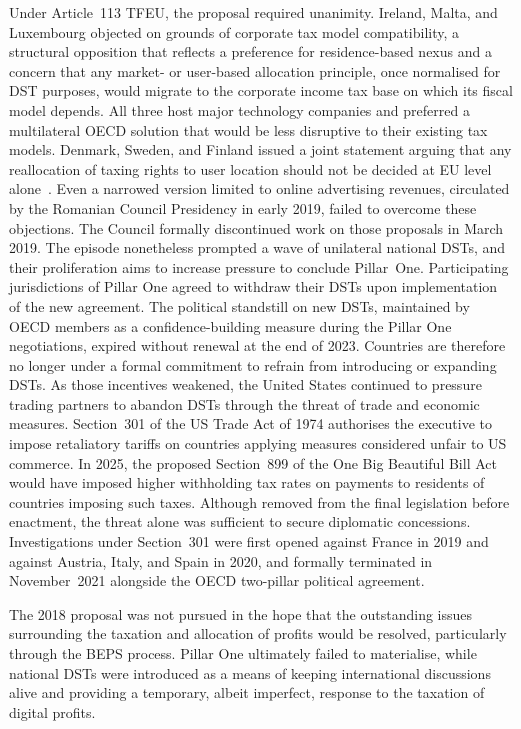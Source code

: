\documentclass[../../main]{subfiles}
\begin{document}
Under Article~113 TFEU, the proposal required unanimity.
Ireland, Malta, and Luxembourg objected on grounds of corporate tax model compatibility, a structural opposition that reflects a preference for residence-based nexus and a concern that any market- or user-based allocation principle, once normalised for DST purposes, would migrate to the corporate income tax base on which its fiscal model depends.
All three host major technology companies and preferred a multilateral OECD solution that would be less disruptive to their existing tax models.
Denmark, Sweden, and Finland issued a joint statement arguing that any reallocation of taxing rights to user location should not be decided at EU level alone~\citep{nordic_fm_statement_2018}.
Even a narrowed version limited to online advertising revenues, circulated by the Romanian Council Presidency in early 2019, failed to overcome these objections.
The Council formally discontinued work on those proposals in March 2019.
The episode nonetheless prompted a wave of unilateral national DSTs, and their proliferation aims to increase pressure to conclude Pillar~One.
Participating jurisdictions of Pillar One agreed to withdraw their DSTs upon implementation of the new agreement.
The political standstill on new DSTs, maintained by OECD members as a confidence-building measure during the Pillar One negotiations, expired without renewal at the end of 2023. 
Countries are therefore no longer under a formal commitment to refrain from introducing or expanding DSTs. 
As those incentives weakened, the United States continued to pressure trading partners to abandon DSTs through the threat of trade and economic measures.
Section~301 of the US Trade Act of 1974 authorises the executive %
to impose retaliatory tariffs on countries applying measures considered unfair to US commerce.
In 2025, the proposed Section~899 of the One Big Beautiful Bill Act would have imposed higher withholding tax rates on payments to residents of countries imposing such taxes. 
Although removed from the final legislation before enactment, the threat alone was sufficient to secure diplomatic concessions.
Investigations under Section~301 were first opened against France in 2019 and against Austria, Italy, and Spain in 2020, and formally terminated in November~2021 alongside the OECD two-pillar political agreement.



The 2018 proposal was not pursued in the hope that the outstanding issues surrounding the taxation and allocation of profits would be resolved, particularly through the BEPS process. 
Pillar One ultimately failed to materialise, while national DSTs were introduced as a means of keeping international discussions alive and providing a temporary, albeit imperfect, response to the taxation of digital profits.
\end{document}
